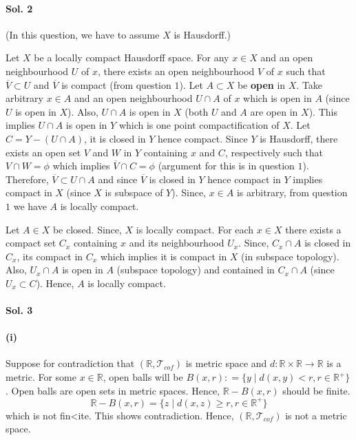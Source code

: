 \documentclass[12pt,reqno]{amsart}
\theoremstyle{plain}
\theoremstyle{definition}
\newcommand{\bb}[1]{\mathbb{#1}}
\newcommand{\cal}[1]{\mathcal{#1}}
\begin{document}
\begin{center}
    \item \paragraph{{\bf Sol. 2}}
\end{center}
(In this question, we have to assume $X$ is Hausdorff.)

Let $X$ be a locally compact Hausdorff space. For any $x \in X$ and an open neighbourhood $U$ of $x$, there exists an open neighbourhood $V$ of $x$ such that $\overline{V} \subset U$ and $\overline{V}$ is compact (from question $1$). Let $A \subset X$ be {\bf open} in $X$. Take arbitrary $x \in A$ and an open neighbourhood $U \cap A$ of $x$ which is open in $A$ (since $U$ is open in $X$). Also, $U \cap A$ is open in $X$ (both $U$ and $A$ are open in $X$). This implies $U \cap A$ is open in $Y$ which is one point compactification of $X$. Let $C = Y - (U \cap A)$, it is closed in $Y$ hence compact. Since $Y$ is Hausdorff, there exists an open set $V$ and $W$ in $Y$ containing $x$ and $C$, respectively such that $V \cap W = \phi$ which implies $\overline{V} \cap C = \phi$ (argument for this is in question $1$). Therefore, $\overline{V} \subset U \cap A$ and since $\overline{V}$ is closed in $Y$ hence compact in $Y$ implies compact in $X$ (since $X$ is subspace of $Y$). Since, $x \in A$ is arbitrary, from question $1$ we have $A$ is locally compact.

Let $A \in X$ be closed. Since, $X$ is locally compact. For each $x \in X$ there exists a compact set $C_x$ containing $x$ and its neighbourhood $U_x$. Since, $C_x \cap A$ is closed in $C_x$, its compact in $C_x$ which implies it is compact in $X$ (in subspace topology). Also, $U_x \cap A$ is open in $A$ (subspace topology) and contained in $C_x \cap A$ (since $U_x \subset C$). Hence, $A$ is locally compact.

\begin{center}
    \item \paragraph{{\bf Sol. 3}}
\end{center}

\paragraph{(i)} Suppose for contradiction that $(\bb R, \cal T_{cof})$ is metric space and $d \colon \bb R \times \bb R \to \bb R$ is a metric. For some $x \in \bb R$, open balls will be $ B(x,r) \colon=\{y \mid d(x,y) < r, r \in \bb R^{+}\}$. Open balls are open sets in metric spaces. Hence, $\bb R - B(x,r)$ should be finite. 
$$ \bb R - B(x,r) = \{z \mid d(x,z) \geq r, r \in \bb R^{+}\}$$ 
which is not fin<ite. This shows contradiction. Hence, $(\bb R, \cal T_{cof})$ is not a metric space.
\end{document}

